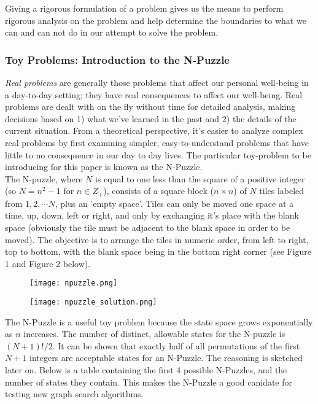 \documentclass[a4, 12pt]{article}
\begin{document}
Giving a rigorous formulation of a problem gives us the means to perform rigorous analysis on the problem and help determine the boundaries to what we can and can not do in our attempt to solve the problem. \\


\subsubsection{Toy Problems: Introduction to the N-Puzzle}
\textit{Real problems} are generally those problems that affect our personal well-being in a day-to-day setting; they have real consequences to affect our well-being. Real problems are dealt with on the fly without time for detailed analysis, making decisions based on 1) what we've learned in the past and 2) the details of the current situation. 
 From a theoretical perspective, it's easier to analyze complex real problems by first examining simpler, easy-to-understand problems that have little to no consequence in our day to day lives. The particular toy-problem to be introducing for this paper is known as the N-Puzzle. \\

The N-puzzle, where $N$ is equal to one less than the square of a positive integer (so $N = n^2 - 1$ for $n \in Z_+$), consists of a square block ($n \times n$) of $N$ tiles labeled from $1,2, \cdots N$, plus an 'empty space'. Tiles can only be moved one space at a time, up, down, left or right, and only by exchanging it's place with the blank space (obviously the tile must be adjacent to the blank space in order to be moved). The objective is to arrange the tiles in numeric order, from left to right, top to bottom, with the blank space being in the bottom right corner (see Figure 1 and Figure 2 below). \\

\begin{figure}
\centering
\begin{minipage}{.5\textwidth}
  \centering
  \texttt{[image: npuzzle.png]}
  \label{fig:sub1}
\end{minipage}%
\begin{minipage}{.5\textwidth}
  \centering
  \texttt{[image: npuzzle\_solution.png]}
  \label{fig:sub2}
\end{minipage}
\end{figure}

The N-Puzzle is a useful toy problem because the state space grows exponentially as $n$ increases. The number of distinct, allowable states for the N-puzzle is $(N + 1)!/2$. It can be shown that exactly half of all permutations of the first $N + 1$ integers are acceptable states for an N-Puzzle. The reasoning is sketched later on. Below is a table containing the first 4 possible N-Puzzles, and the number of states they contain. This makes the N-Puzzle a good canidate for testing new graph search algorithms. \\
\end{document}
